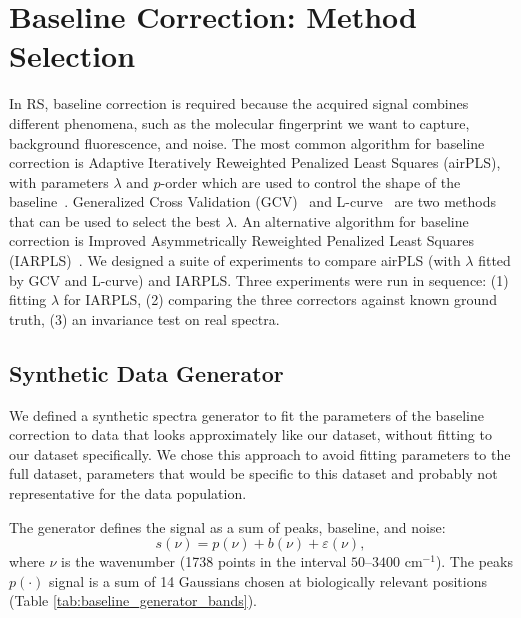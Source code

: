 \appendix

\section{Baseline Correction: Method Selection}
\label{app:baseline_correction}
\setcounter{table}{0}
\renewcommand{\thetable}{\Alph{section}.\arabic{table}}

In RS, baseline correction is required because the acquired signal combines different phenomena, such as the molecular fingerprint we want to capture, background fluorescence, and noise. The most common algorithm for baseline correction is Adaptive Iteratively Reweighted Penalized Least Squares (airPLS), with parameters $\lambda$ and $p$-order which are used to control the shape of the baseline~\cite{Zhang2010}. Generalized Cross Validation (GCV)~\cite{craven1978smoothing} and L-curve~\cite{hansen1992analysis} are two methods that can be used to select the best $\lambda$. An alternative algorithm for baseline correction is Improved Asymmetrically Reweighted Penalized Least Squares (IARPLS)~\cite{ye2020baseline}. We designed a suite of experiments to compare airPLS (with $\lambda$ fitted by GCV and L-curve) and IARPLS. Three experiments were run in sequence: (1) fitting $\lambda$ for IARPLS, (2) comparing the three correctors against known ground truth, (3) an invariance test on real spectra.


\subsection*{Synthetic Data Generator}
We defined a synthetic spectra generator to fit the parameters of the baseline correction to data that looks approximately like our dataset, without fitting to our dataset specifically. We chose this approach to avoid fitting parameters to the full dataset, parameters that would be specific to this dataset and probably not representative for the data population.

The generator defines the signal as a sum of peaks, baseline, and noise:
\begin{equation*}
   s(\nu) = p(\nu) + b(\nu) + \varepsilon(\nu), 
\end{equation*} where $\nu$ is the wavenumber (1738 points in the interval $50$--$3400\text{ cm}^{-1}$). The peaks $p(\cdot)$ signal is a sum of 14 Gaussians chosen at biologically relevant positions (Table \ref{tab:baseline_generator_bands}). 


